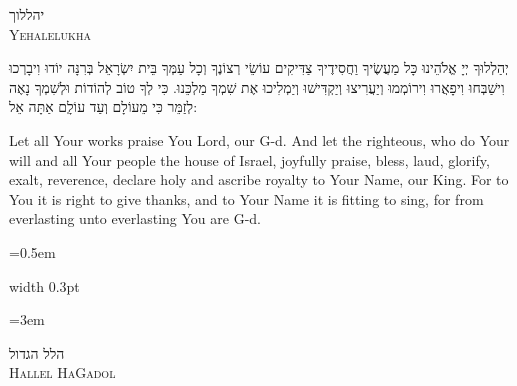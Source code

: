 \documentclass[11pt, openany]{book}
\newcommand{\sederdivider}{%
  \par\vspace{6pt}
  \begin{center}
    \textcolor{sedergold}{\pgfornament[width=1.5cm]{11}}
  \end{center}
  \par\vspace{6pt}
}
\newlength{\bidiHebWidth}
\newlength{\bidiEngWidth}
\newenvironment{bilingual}{%
  \par\vspace{4pt}%
}{%
  \noindent
  \begin{minipage}[t]{\bidiEngWidth}
    \setstretch{1.4}\emergencystretch=0.5em\normalsize
    \usebox{\bidiEngBox}
  \end{minipage}%
  \hfill
  {\color{sedergold}\vrule width 0.3pt}%
  \hfill
  \begin{minipage}[t]{\bidiHebWidth}
    \begingroup\hebrewfont\TeXXeTstate=1\beginR
    \large\setstretch{1.4}\emergencystretch=3em\tolerance=9999\parindent=0pt\relax
    \usebox{\bidiHebBox}
    \endR\endgroup
  \end{minipage}%
  \par\vspace{2pt}%
}
\newenvironment{hebrewcol}{%
  \begin{lrbox}{\bidiHebBox}\begin{minipage}{\bidiHebWidth}%
}{%
  \end{minipage}\end{lrbox}%
}
\newenvironment{englishcol}{%
  \begin{lrbox}{\bidiEngBox}\begin{minipage}{\bidiEngWidth}%
}{%
  \end{minipage}\end{lrbox}%
}
\newcommand{\subsedertitle}[2]{%
  \par\vspace{8pt}
  \begin{center}
    {\hebrewfontlarge\TeXXeTstate=1\beginR\textcolor{sederblue}{#1}\endR}\\[3pt]
    {\normalsize\scshape\textcolor{sederblue}{#2}}
  \end{center}
  \par\vspace{3pt}
}
\begin{document}
\subsedertitle{יהללוך}{Yehalelukha}

\begin{bilingual}
\begin{hebrewcol}
יְהַלְלוּךָ יְיָ אֱלֹהֵינוּ כָּל מַעֲשֶׂיךָ וַחֲסִידֶיךָ צַדִּיקִים עוֹשֵׂי רְצוֹנֶךָ וְכָל עַמְּךָ בֵּית יִשְׂרָאֵל בְּרִנָּה יוֹדוּ וִיבָרְכוּ וִישַׁבְּחוּ וִיפָאֲרוּ וִירוֹמְמוּ וְיַעֲרִיצוּ וְיַקְדִּישׁוּ וְיַמְלִיכוּ אֶת שִׁמְךָ מַלְכֵּנוּ. כִּי לְךָ טוֹב לְהוֹדוֹת וּלְשִׁמְךָ נָאֶה לְזַמֵּר כִּי מֵעוֹלָם וְעַד עוֹלְָם אַתָּה אֵל:
\end{hebrewcol}
\begin{englishcol}
Let all Your works praise You Lord, our G-d. And let the righteous, who do Your will and all Your people the house of Israel, joyfully praise, bless, laud, glorify, exalt, reverence, declare holy and ascribe royalty to Your Name, our King. For to You it is right to give thanks, and to Your Name it is fitting to sing, for from everlasting unto everlasting You are G-d.
\end{englishcol}
\end{bilingual}
\sederdivider

\subsedertitle{הלל הגדול}{Hallel HaGadol}
\end{document}
